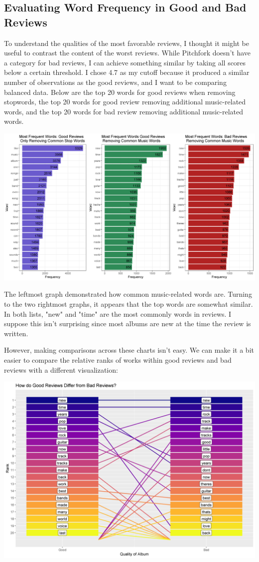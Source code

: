 \documentclass[a4paper,12pt]{article}
\begin{document}
\subsection{Evaluating Word Frequency in Good and Bad Reviews}
To understand the qualities of the most favorable reviews, I thought it might be useful to contrast the content of the worst reviews. While Pitchfork doesn't have a category for bad reviews, I can achieve something similar by taking all scores below a certain threshold. I chose 4.7 as my cutoff because it produced a similar number of observations as the good reviews, and I want to be comparing balanced data. Below are the top 20 words for good reviews when removing stopwords, the top 20 words for good review removing additional music-related words, and the top 20 words for bad review removing additional music-related words.

\includegraphics[width = 0.95\linewidth]{"figures/word_distribution_plot.png"}

The leftmost graph demonstrated how common music-related words are. Turning to the two rightmost graphs, it appears that the top words are somewhat similar. In both lists, "new" and "time" are the most commonly words in reviews. I suppose this isn't surprising since most albums are new at the time the review is written. 

However, making comparisons across these charts isn't easy. We can make it a bit easier to compare the relative ranks of works within good reviews and bad reviews with a different visualization:

\includegraphics[width = 0.95\linewidth]{"figures/word_comparison.png"}
\end{document}
